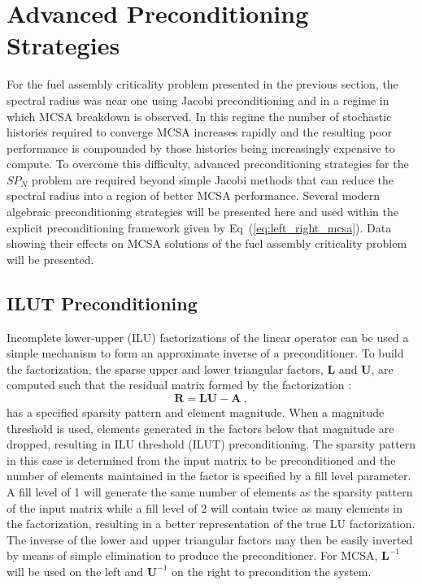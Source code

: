 \clearpage

\section{Advanced Preconditioning Strategies}
\label{subsec:spn_advanced_preconditioning}
For the fuel assembly criticality problem presented in the previous
section, the spectral radius was near one using Jacobi preconditioning
and in a regime in which MCSA breakdown is observed. In this regime
the number of stochastic histories required to converge MCSA increases
rapidly and the resulting poor performance is compounded by those
histories being increasingly expensive to compute. To overcome this
difficulty, advanced preconditioning strategies for the $SP_N$ problem
are required beyond simple Jacobi methods that can reduce the spectral
radius into a region of better MCSA performance. Several modern
algebraic preconditioning strategies will be presented here and used
within the explicit preconditioning framework given by
Eq~(\ref{eq:left_right_mcsa}). Data showing their effects on MCSA
solutions of the fuel assembly criticality problem will be presented.

\subsection{ILUT Preconditioning}
\label{subsec:spn_ilut_preconditioning}
Incomplete lower-upper (ILU) factorizations of the linear operator can
be used a simple mechanism to form an approximate inverse of a
preconditioner. To build the factorization, the sparse upper and lower
triangular factors, $\mathbf{L}$ and $\mathbf{U}$, are computed such
that the residual matrix formed by the factorization
\citep{saad_iterative_2003}:
\begin{equation}
  \mathbf{R} = \mathbf{L} \mathbf{U} - \mathbf{A} \:,
  \label{eq:ilu_residual_matrix}
\end{equation}
has a specified sparsity pattern and element magnitude. When a
magnitude threshold is used, elements generated in the factors below
that magnitude are dropped, resulting in ILU threshold (ILUT)
preconditioning. The sparsity pattern in this case is determined from
the input matrix to be preconditioned and the number of elements
maintained in the factor is specified by a fill level parameter. A
fill level of 1 will generate the same number of elements as the
sparsity pattern of the input matrix while a fill level of 2 will
contain twice as many elements in the factorization, resulting in a
better representation of the true LU factorization. The inverse of the
lower and upper triangular factors may then be easily inverted by
means of simple elimination to produce the preconditioner. For MCSA,
$\mathbf{L}^{-1}$ will be used on the left and $\mathbf{U}^{-1}$ on
the right to precondition the system.

